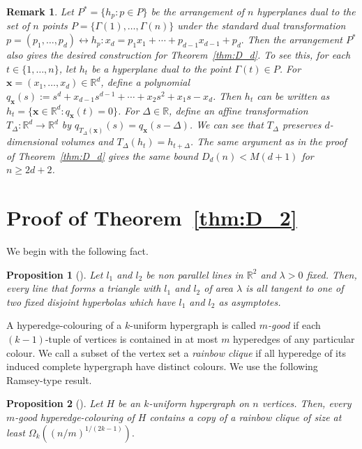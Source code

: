 \documentclass[a4paper,oneside,10pt]{amsart}
\newtheorem{prop}{Proposition}
\newtheorem{rem}{Remark}
\begin{document}
\begin{rem}
Let $P^{*}=\{h_p : p\in P\}$ be the arrangement of $n$ hyperplanes dual to the set of $n$ points $P=\{\Gamma(1),\dots,\Gamma(n)\}$ under the standard dual transformation
$
p=(p_1,\dots,p_d)
 \longleftrightarrow
h_p: x_d=p_1x_1+\cdots+p_{d-1}x_{d-1}+p_d.
$
Then the arrangement \(P^{*}\) also gives the desired construction for Theorem~\ref{thm:D_d}.
To see this, for each $t\in\{1,\ldots,n\}$, let $h_t$ be a hyperplane dual to the point $\Gamma(t)\in P$. For $\bm{x}=(x_1,\ldots,x_d)\in\mathbb R^d$, define a polynomial $q_{\bm{x}}(s):=s^d+x_{d-1}s^{d-1}+\cdots+x_2s^2+x_1s-x_d$. Then $h_t$ can be written as $h_t=\{\bm{x}\in\mathbb R^d:q_{\bm{x}}(t)=0\}$. For $\Delta\in\mathbb R$, define an affine transformation $T_\Delta:\mathbb R^d\to\mathbb R^d$ by $q_{T_\Delta(\bm{x})}(s)=q_{\bm{x}}(s-\Delta)$. We can see that $T_{\Delta}$ preserves $d$-dimensional volumes and $T_\Delta(h_t)=h_{t+\Delta}$. The same argument as in the proof of Theorem~\ref{thm:D_d} gives the same bound $D_d(n) < M(d+1)$ for $n\geq 2d+2$. 
\end{rem}


\section{Proof of Theorem~\ref{thm:D_2}}

We begin with the following fact.

\begin{prop}[\cite{damasdi2020triangle,furukawa2025simplex}] \label{prop:hyperbola}
Let $l_1$ and $l_2$ be non parallel lines in $\mathbb{R}^2$ and $\lambda>0$ fixed.
Then, every line that forms a triangle with $l_1$ and $l_2$ of area $\lambda$ is all tangent to one of two fixed disjoint hyperbolas which have $l_1$ and $l_2$ as asymptotes.
\end{prop}

A hyperedge-colouring of a $k$-uniform hypergraph is called \textit{$m$-good} if each $(k-1)$-tuple of vertices is contained in at most $m$ hyperedges of any particular colour. 
We call a subset of the vertex set a \textit{rainbow clique} if all hyperedge of its induced complete hypergraph have distinct colours.
We use the following Ramsey-type result.

\begin{prop}[\cite{conlon2015distinct,martinez2015sunflower}] \label{prop:conlon}
Let $H$ be an $k$-uniform hypergraph on $n$ vertices. Then, every $m$-good hyperedge-colouring of $H$ contains a copy of a rainbow clique of size at least 
$
\Omega_k ((n/m)^{1/(2k-1)}).
$
\end{prop}
\end{document}
